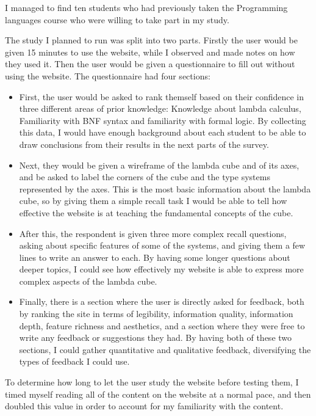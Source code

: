\documentclass{l4proj}
\begin{document}
I managed to find ten students who had previously taken the Programming languages course who were willing to take part in my study.

The study I planned to run was split into two parts.  Firstly the user would be given 15 minutes to use the website, while I observed and made notes on how they used it.  Then the user would be given a questionnaire to fill out without using the website.  The questionnaire had four sections:

\begin{itemize}
    \item First, the user would be asked to rank themself based on their confidence in three different areas of prior knowledge: Knowledge about lambda calculus, Familiarity with BNF syntax and familiarity with formal logic.  By collecting this data, I would have enough background about each student to be able to draw conclusions from their results in the next parts of the survey.

    \item Next, they would be given a wireframe of the lambda cube and of its axes, and be asked to label the corners of the cube and the type systems represented by the axes.  This is the most basic information about the lambda cube, so by giving them a simple recall task I would be able to tell how effective the website is at teaching the fundamental concepts of the cube.

    \item After this, the respondent is given three more complex recall questions, asking about specific features of some of the systems, and giving them a few lines to write an answer to each.  By having some longer questions about deeper topics, I could see how effectively my website is able to express more complex aspects of the lambda cube.

    \item Finally, there is a section where the user is directly asked for feedback, both by ranking the site in terms of legibility, information quality, information depth, feature richness and aesthetics, and a section where they were free to write any feedback or suggestions they had.  By having both of these two sections, I could gather quantitative and qualitative feedback, diversifying the types of feedback I could use.
\end{itemize}

To determine how long to let the user study the website before testing them, I timed myself reading all of the content on the website at a normal pace, and then doubled this value in order to account for my familiarity with the content.
\end{document}
